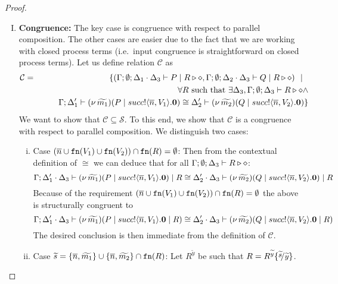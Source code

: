 \begin{proof}
\begin{enumerate}[I.]
		\item	{\bf Congruence:}
				The key case is congruence with respect to parallel composition.
				The other cases are easier due to the fact that we are
				working with closed process terms
				(i.e.~input congruence is straightforward on closed process terms).
				Let us define relation $\mathcal{C}$ as
				\begin{eqnarray*}
					\mathcal{C} &=&
					\{	(\Gamma; \emptyset; \Delta_1 \cdot \Delta_3 \vdash P \;|\; R \triangleright \diamond,
							\Gamma; \emptyset; \Delta_2 \cdot \Delta_3 \vdash Q \;|\; R \triangleright \diamond) \ \ |\ \ 
					\\
					& &	\qquad \forall R \textrm{ such that } \exists \Delta_3, \Gamma;\emptyset; \Delta_3 \vdash R \triangleright \diamond \land\\
					& &	\qquad \Gamma; \Delta_1' \vdash (\nu\, \widetilde{m_1})(P \;|\; succ ! \langle \overline{n}, V_1 \rangle . \mathbf{0}) \cong \Delta_2' \vdash (\nu\, \widetilde{m_2})(Q \;|\; succ ! \langle \overline{n}, V_2 \rangle . \mathbf{0})\}
				\end{eqnarray*}
				We want to show that $\mathcal{C} \subseteq \mathcal{S}$.
				To this end, we show that $\mathcal{C}$ is a congruence with respect to parallel composition.
				We distinguish two cases:
				\begin{enumerate}[i)]
					\item	Case $(\overline{n} \cup \mathtt{fn}(V_1) \cup \mathtt{fn}(V_2)) \cap \mathtt{fn}(R) = \emptyset$: Then
from the contextual definition of $\cong$ we can deduce that
							 for all $\Gamma; \emptyset; \Delta_3 \vdash R \triangleright \diamond$:
							\[
								\Gamma; \Delta_1' \cdot \Delta_3 \vdash (\nu\, \widetilde{m_1})(P \;|\; succ ! \langle \overline{n}, V_1 \rangle . \mathbf{0}) \;|\; R \cong \Delta_2' \cdot \Delta_3 \vdash (\nu\, \widetilde{m_2})(Q \;|\; succ ! \langle \overline{n}, V_2 \rangle . \mathbf{0}) \;|\; R
							\]
							Because of the requirement
							$(\overline{n} \cup \mathtt{fn}(V_1) \cup \mathtt{fn}(V_2)) \cap \mathtt{fn}(R) = \emptyset$
							the above is structurally congruent to
							\[
								\Gamma; \Delta_1' \cdot \Delta_3 \vdash (\nu\, \widetilde{m_1})(P \;|\; succ ! \langle \overline{n}, V_1 \rangle . \mathbf{0} \;|\; R) \cong \Delta_2' \cdot \Delta_3 \vdash (\nu\, \widetilde{m_2})(Q \;|\; succ ! \langle \overline{n}, V_2 \rangle . \mathbf{0} \;|\; R)
							\]
							The desired conclusion is then immediate from 
							 the definition of $\mathcal{C}$.

					\item	%
							Case $\widetilde{s} = \{\overline{n}, \widetilde{m_1}\} \cup \{\overline{n}, \widetilde{m_2}\} \cap \mathtt{fn}(R)$:
							Let $R^{\widetilde{y}}$ be such that $R = R^{\widetilde{y}}\subst{\widetilde{s}}{\widetilde{y}}$.



\end{enumerate}
\end{enumerate}
\end{proof}
